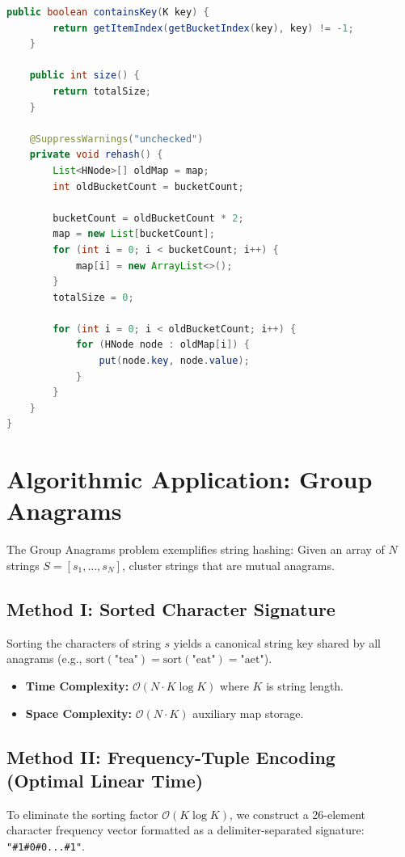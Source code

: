 \documentclass[10pt,twocolumn,letterpaper]{article}
\begin{document}
\begin{lstlisting}[language=Java,caption={Generic CustomHashMap Implementation in Java}]
    public boolean containsKey(K key) {
        return getItemIndex(getBucketIndex(key), key) != -1;
    }

    public int size() {
        return totalSize;
    }

    @SuppressWarnings("unchecked")
    private void rehash() {
        List<HNode>[] oldMap = map;
        int oldBucketCount = bucketCount;

        bucketCount = oldBucketCount * 2;
        map = new List[bucketCount];
        for (int i = 0; i < bucketCount; i++) {
            map[i] = new ArrayList<>();
        }
        totalSize = 0;

        for (int i = 0; i < oldBucketCount; i++) {
            for (HNode node : oldMap[i]) {
                put(node.key, node.value);
            }
        }
    }
}
\end{lstlisting}

\section{Algorithmic Application: Group Anagrams}
\label{sec:anagrams}

The Group Anagrams problem exemplifies string hashing: Given an array of $N$ strings $S = [s_1, \dots, s_N]$, cluster strings that are mutual anagrams.

\subsection{Method I: Sorted Character Signature}
Sorting the characters of string $s$ yields a canonical string key shared by all anagrams (e.g., $\text{sort}(\text{"tea"}) = \text{sort}(\text{"eat"}) = \text{"aet"}$).
\begin{itemize}
    \item \textbf{Time Complexity:} $\mathcal{O}(N \cdot K \log K)$ where $K$ is string length.
    \item \textbf{Space Complexity:} $\mathcal{O}(N \cdot K)$ auxiliary map storage.
\end{itemize}

\subsection{Method II: Frequency-Tuple Encoding (Optimal Linear Time)}
To eliminate the sorting factor $\mathcal{O}(K \log K)$, we construct a 26-element character frequency vector formatted as a delimiter-separated signature: \texttt{"\#1\#0\#0...\#1"}.
\end{document}
